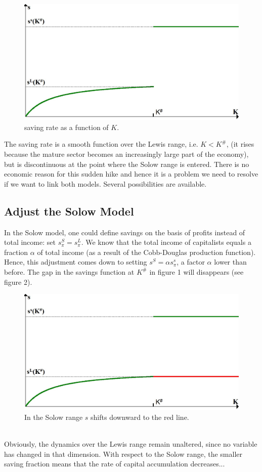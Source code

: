 \documentclass[a4paper]{article}
\begin{document}
\newline
\begin{figure}[!ht]
\includegraphics[width=\textwidth]{EndoSavings.jpg}
\caption{saving rate as a function of $K$.}
\end{figure}
\newline
\noindent The saving rate is a smooth function over the Lewis range, i.e. $K<K^{\#}$, (it rises because the mature sector becomes an increasingly large part of the economy), but is discontinuous at the point where the Solow range is entered. There is no economic reason for this sudden hike and hence it is a problem we need to resolve if we want to link both models. Several possibilities are available.

\subsection{Adjust the Solow Model}

In the Solow model, one could define savings on the basis of profits instead of total income: set $s_{\pi}^S=s_{\pi}^L$. We know that the total income of capitalists equals a fraction ${\alpha}$ of total income (as a result of the Cobb-Douglas production function). Hence, this adjustment comes down to setting $s^S={\alpha}s_{\pi}^s$, a factor ${\alpha}$ lower than before. The gap in the savings function at $K^{\#}$ in figure 1 will disappears (see figure 2).
\begin{figure}[!ht]
\includegraphics[width=\textwidth]{EndoSavings1.jpg}
\caption{In the Solow range $s$ shifts downward to the red line.}
\end{figure}\\
Obviously, the dynamics over the Lewis range remain unaltered, since no variable has changed in that dimension. With respect to the Solow range, the smaller saving fraction means that the rate of capital accumulation decreases...
\end{document}

